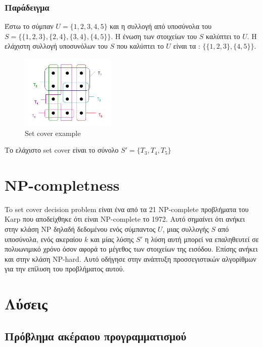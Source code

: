 \subsubsection{Παράδειγμα}
Έστω το σύμπαν $U = \{1, 2, 3, 4 ,5\}$ και η συλλογή από υποσύνολα του $S=\{\{1,2,3\},\{2,4\},\{3,4\},\{4,5\}\}
$. Η ένωση των στοιχείων του $S$ καλύπτει το $U$. H ελάχιστη συλλογή υποσυνόλων του $S$ που καλύπτει το $U$ είναι τα : $\{\{1,2,3\},\{4,5\}\}$.

\begin{figure}
\caption{Set cover example}
\centering
\includegraphics[width=0.4\textwidth]{Figures/set_cover.png}\centering
\end{figure}

Το ελάχιστο set cover είναι το σύνολο $S' = \{T_3, T_4, T_5\}$


\section{NP-completness}

To set cover decision problem είναι ένα από τα 21 NP-complete προβλήματα του Karp που αποδείχθηκε ότι είναι NP-complete το 1972. Αυτό σημαίνει ότι ανήκει στην κλάση NP δηλαδή δεδομένου ενός σύμπαντος $U$, μιας συλλογής $S$ από υποσύνολα, ενός ακεραίου $k$ και μίας λύσης $S'$ η λύση αυτή μπορεί να επαληθευτεί σε πολυωνιμικό χρόνο όσον αφορά το μέγεθος των στοιχείων της εισόδου. Επίσης ανήκει και στην κλάση NP-hard. Αυτό οδήγησε στην ανάπτυξη προσσεγιστικών αλγορίθμων για την επίλυση του προβλήματος αυτού.


\section{Λύσεις}

\subsection{Πρόβλημα ακέραιου προγραμματισμού}

